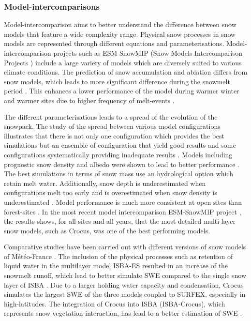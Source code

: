 \documentclass[hydrology,article,submit,moreauthors,pdftex]{Definitions/mdpi}
\begin{document}
\subsubsection{Model-intercomparisons}

Model-intercomparison aims to better understand the difference between snow models that feature a wide complexity range. Physical snow processes in snow models are represented through different equations and parameterisations. Model-intercomparison projects such as ESM-SnowMIP (Snow Models Intercomparison Projects ) \citep{Krinner_2018} include a large variety of models which are diversely suited to various climate conditions. The prediction of snow accumulation and ablation differs from snow models, which leads to more significant difference during the snowmelt period \citep{Etchevers_2004}. This enhances a lower performance of the model during warmer winter and warmer sites due to higher frequency of melt-events \citep{Etchevers_2004}.


The different parameterisations leads to a spread of the evolution of the snowpack. 
The study of the spread between various model configurations illustrates that there is not only one configuration which provides the best simulations but an ensemble of configuration that yield good results and some configurations systematically providing inadequate results \citep{Essery_2013}. Models including prognostic snow density and albedo were shown to lead to better performance \citep{Essery_2013,Boone_2004}. The best simulations in terms of snow mass use an hydrological option which retain melt water. Additionally, snow depth is underestimated when configurations melt too early and is overestimated when snow density is underestimated \citep{Essery_2013}. Model performance is much more consistent at open sites than forest-sites \citep{Rutter_2009}. In the most recent model intercomparison ESM-SnowMIP project \citep{Krinner_2018}, the results shows, for all sites and all years, that the most detailed multi-layer snow models, such as Crocus, was one of the best performing models. 

Comparative studies have been carried out with different versions of snow models of Météo-France \citep{Boone_2001,Vionnet_2012,Decharme_2016}. The inclusion of the physical processes such as retention of liquid water in the multilayer model ISBA-ES resulted in an increase of the snowmelt runoff, which lead to better simulate SWE compared to the single snow layer of ISBA \citep{Boone_2001}. Due to a larger holding water capacity and condensation, Crocus simulates the largest SWE of the three models coupled to SURFEX, especially in high-latitudes. The integration of Crocus into ISBA (ISBA-Crocus), which represents snow-vegetation interaction, has lead to a better estimation of SWE \citep{Vionnet_2012}. 
\end{document}
